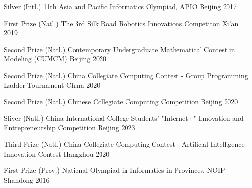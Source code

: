 \begin{cvhonors}

\cvhonor
{Silver} %
{(Intl.) 11th Asia and Pacific Informatics Olympiad, APIO} %
{Beijing} %
{2017} %

\cvhonor
{First Prize} %
{(Natl.) The 3rd Silk Road Robotics Innovations Competiton} %
{Xi'an} %
{2019} %

\cvhonor
{Second Prize} %
{(Natl.) Contemporary Undergraduate Mathematical Contest in Modeling (CUMCM)} %
{Beijing} %
{2020} %

\cvhonor
{Second Prize} %
{(Natl.) China Collegiate Computing Contest - Group Programming Ladder Tournament} %
{China} %
{2020} %


\cvhonor
{Second Prize} %
{(Natl.) Chinese Collegiate Computing Competition} %
{Beijing} %
{2020} %


\cvhonor
{Sliver} %
{(Natl.) China International College Students' "Internet+" Innovation and Entrepreneurship Competition} %
{Beijing} %
{2023} %

\cvhonor
{Third Prize} %
{(Natl.) China Collegiate Computing Contest - Artificial Intelligence Innovation Contest} %
{Hangzhou} %
{2020} %






\cvhonor
{First Prize} %
{(Prov.) National Olympiad in Informatics in Provinces, NOIP} %
{Shandong} %
{2016} %


\end{cvhonors}
